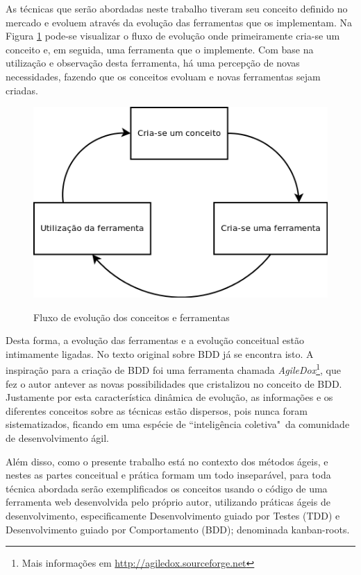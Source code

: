 As técnicas que serão abordadas neste trabalho tiveram seu conceito definido no mercado e evoluem através da evolução das ferramentas que os implementam. Na Figura \ref{img:fluxo_conceito_ferramenta} pode-se visualizar o fluxo de evolução onde primeiramente cria-se um conceito e, em seguida, uma ferramenta que o implemente. Com base na utilização e observação desta ferramenta, há uma percepção de novas necessidades, fazendo que os conceitos evoluam e novas ferramentas sejam criadas.

\begin{figure}[h]
  \center
  \caption{Fluxo de evolução dos conceitos e ferramentas}
  \includegraphics[scale=0.60]{images/fluxo-conceito-ferramenta}
  \label{img:fluxo_conceito_ferramenta}
\end{figure}

Desta forma, a evolução das ferramentas e a evolução conceitual estão intimamente ligadas. No texto original sobre BDD \cite{IntroducingBDD} já se encontra isto. A inspiração para a criação de BDD foi uma ferramenta chamada \textit{AgileDox}\footnote{Mais informações em \url{http://agiledox.sourceforge.net}}, que fez o autor antever as novas possibilidades que cristalizou no conceito de BDD. Justamente por esta característica dinâmica de evolução, as informações e os diferentes conceitos sobre as técnicas estão dispersos, pois nunca foram sistematizados, ficando em uma espécie de ``inteligência coletiva"\ da comunidade de desenvolvimento ágil.

Além disso, como o presente trabalho está no contexto dos métodos ágeis, e nestes as partes conceitual e prática formam um todo inseparável, para toda técnica abordada serão exemplificados os conceitos usando o código de uma ferramenta web desenvolvida pelo próprio autor, utilizando práticas ágeis de desenvolvimento, especificamente Desenvolvimento guiado por Testes (TDD) e Desenvolvimento guiado por Comportamento (BDD); denominada kanban-roots.

